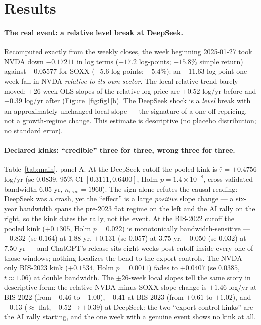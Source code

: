 \documentclass[11pt]{article}
\begin{document}
\section{Results}\label{sec:results}

\paragraph{The real event: a relative level break at DeepSeek.} Recomputed
exactly from the weekly closes, the week beginning 2025-01-27 took NVDA down
$-0.17211$ in log terms ($-17.2$ log-points; $-15.8\%$ simple return) against
$-0.05577$ for SOXX ($-5.6$ log-points; $-5.4\%$): an $-11.63$ log-point
one-week fall in NVDA \emph{relative to its own sector}. The local relative
trend barely moved: $\pm 26$-week OLS slopes of the relative log price are
$+0.52$ log/yr before and $+0.39$ log/yr after
(Figure~\ref{fig:fig1}b). The DeepSeek shock is a \emph{level} break with an
approximately unchanged local slope --- the signature of a one-off repricing,
not a growth-regime change. This estimate is descriptive (no placebo
distribution; no standard error).

\paragraph{Declared kinks: ``credible'' three for three, wrong three for
three.} Table~\ref{tab:main}, panel A. At the DeepSeek cutoff the pooled
kink is $\hat\tau = +0.4756$ log/yr (se $0.0839$, 95\% CI $[0.3111, 0.6400]$,
Holm $p = 1.4\times 10^{-8}$, cross-validated bandwidth $6.05$ yr,
$n_{\mathrm{used}} = 1960$). The sign alone refutes the causal reading:
DeepSeek was a crash, yet the ``effect'' is a large \emph{positive} slope
change --- a six-year bandwidth spans the pre-2023 flat regime on the left
and the AI rally on the right, so the kink dates the rally, not the event. At the BIS-2022 cutoff the pooled kink
($+0.1305$, Holm $p = 0.022$) is monotonically bandwidth-sensitive ---
$+0.832$ (se $0.164$) at $1.88$ yr, $+0.131$ (se $0.057$) at $3.75$ yr,
$+0.050$ (se $0.032$) at $7.50$ yr --- and ChatGPT's release sits eight weeks
post-cutoff inside every one of those windows; nothing localizes the bend to
the export controls. The NVDA-only BIS-2023 kink ($+0.1534$, Holm
$p = 0.0011$) fades to $+0.0407$ (se $0.0385$, $t \approx 1.06$) at double
bandwidth. The $\pm 26$-week local slopes tell the same story in descriptive
form: the relative NVDA-minus-SOXX slope change is $+1.46$ log/yr at
BIS-2022 (from $-0.46$ to $+1.00$), $+0.41$ at BIS-2023 (from $+0.61$ to
$+1.02$), and $-0.13$ ($\approx$ flat, $+0.52 \to +0.39$) at DeepSeek: the
two ``export-control kinks'' are the AI rally starting, and the one week
with a genuine event shows no kink at all.
\end{document}
